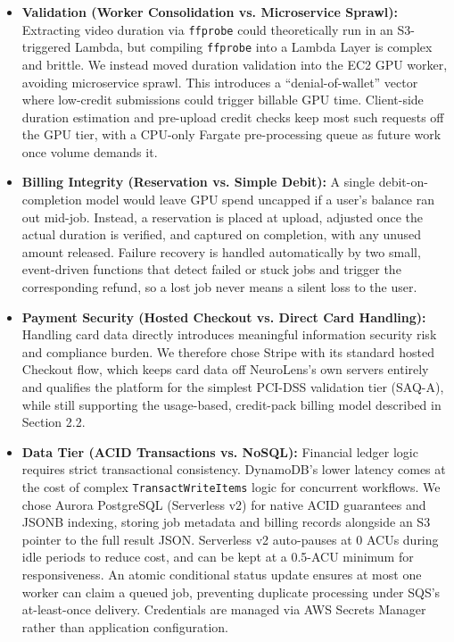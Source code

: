 \documentclass[10pt,a4paper]{article}
\begin{document}
\begin{itemize}
    \item \textbf{Validation (Worker Consolidation vs. Microservice Sprawl):} Extracting video duration via \texttt{ffprobe} could theoretically run in an S3-triggered Lambda, but compiling \texttt{ffprobe} into a Lambda Layer is complex and brittle. We instead moved duration validation into the EC2 GPU worker, avoiding microservice sprawl. This introduces a ``denial-of-wallet'' vector where low-credit submissions could trigger billable GPU time. Client-side duration estimation and pre-upload credit checks keep most such requests off the GPU tier, with a CPU-only Fargate pre-processing queue as future work once volume demands it.

    \item \textbf{Billing Integrity (Reservation vs. Simple Debit):} A single debit-on-completion model would leave GPU spend uncapped if a user's balance ran out mid-job. Instead, a reservation is placed at upload, adjusted once the actual duration is verified, and captured on completion, with any unused amount released. Failure recovery is handled automatically by two small, event-driven functions that detect failed or stuck jobs and trigger the corresponding refund, so a lost job never means a silent loss to the user.

        \item \textbf{Payment Security (Hosted Checkout vs. Direct Card Handling):} Handling card data directly introduces meaningful information security risk and compliance burden. We therefore chose Stripe with its standard hosted Checkout flow, which keeps card data off NeuroLens's own servers entirely and qualifies the platform for the simplest PCI-DSS validation tier (SAQ-A), while still supporting the usage-based, credit-pack billing model described in Section 2.2.

    \item \textbf{Data Tier (ACID Transactions vs. NoSQL):} Financial ledger logic requires strict transactional consistency. DynamoDB's lower latency comes at the cost of complex \texttt{TransactWriteItems} logic for concurrent workflows. We chose Aurora PostgreSQL (Serverless v2) for native ACID guarantees and JSONB indexing, storing job metadata and billing records alongside an S3 pointer to the full result JSON. Serverless v2 auto-pauses at 0 ACUs during idle periods to reduce cost, and can be kept at a 0.5-ACU minimum for responsiveness. An atomic conditional status update ensures at most one worker can claim a queued job, preventing duplicate processing under SQS's at-least-once delivery. Credentials are managed via AWS Secrets Manager rather than application configuration.
\end{itemize}
\end{document}
